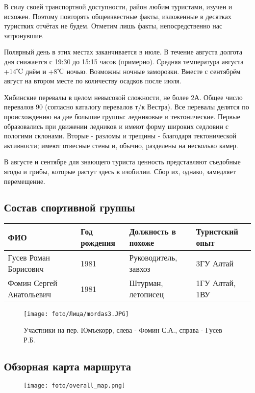 В силу своей транспортной доступности, район любим туристами, изучен и исхожен.
Поэтому повторять общеизвестные факты, изложенные в десятках туристких отчётах не будем.
Отметим лишь факты, непосредственно нас затронувшие.

Полярный день в этих местах заканчивается в июле. В течение августа долгота дня снижается с
19:30 до 15:15 часов (примерно). Средняя температура августа +14$\tccentigrade$ днём и +8$\tccentigrade$ ночью.
Возможны ночные заморозки. Вместе с сентябрём август на втором месте по количеству осадков после июля.

Хибинские перевалы в целом невысокой сложности, не более 2А. Общее число перевалов 90 (согласно каталогу
перевалов т/к Вестра). Все перевалы делятся по происхождению на две большие группы: ледниковые и тектонические.
Первые образовались при движении ледников и имеют форму широких седловин с пологими склонами.
Вторые - разломы и трещины - благодаря тектонической активности;
имеют отвесные стены и, обычно, разделены на несколько камер.

В августе и сентябре для знающего туриста ценность представляют съедобные ягоды и грибы, которые растут здесь в изобилии.
Сбор их, однако, замедляет перемещение.

\subsection{Состав спортивной группы}
\begin{tabular}{|l|l|l|l|}
    \hline
    ФИО & Год рождения & Должность в похоже & Туристский опыт\\
    \hline
    Гусев Роман Борисович &
    1981 &
    Руководитель, завхоз &
	3ГУ Алтай
    \\
    \hline
    Фомин Сергей Анатольевич &
    1981 &
    Штурман, летописец &
	1ГУ Алтай, 1ВУ
    \\
    \hline
\end{tabular}

\begin{figure}[H]
    \texttt{[image: foto/Лица/mordas3.JPG]}
    \caption*{Участники на пер. Юмъекорр, слева - Фомин С.А., справа - Гусев Р.Б.}
\end{figure}

\subsection{Обзорная карта маршрута}
\begin{figure}[H]
    \texttt{[image: foto/overall\_map.png]}
\end{figure}


